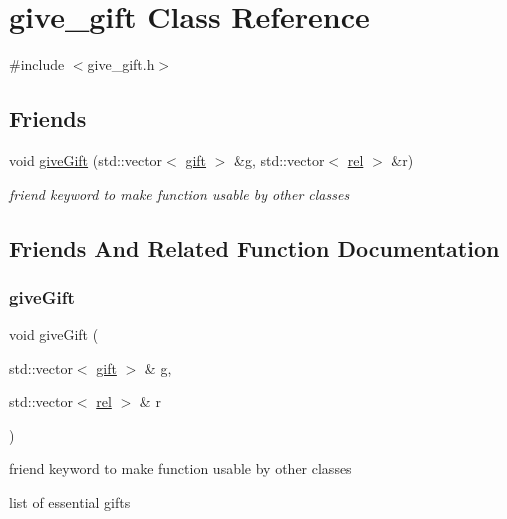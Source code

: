 \hypertarget{classgive__gift}{}\section{give\+\_\+gift Class Reference}
\label{classgive__gift}


{\ttfamily \#include $<$give\+\_\+gift.\+h$>$}

\subsection*{Friends}
\begin{DoxyCompactItemize}
\item 
void \hyperlink{classgive__gift_a4d58aac625b116fce2965ee8ed463409}{give\+Gift} (std\+::vector$<$ \hyperlink{classgift}{gift} $>$ \&g, std\+::vector$<$ \hyperlink{classrel}{rel} $>$ \&r)
\begin{DoxyCompactList}\small\item\em friend keyword to make function usable by other classes \end{DoxyCompactList}\end{DoxyCompactItemize}


\subsection{Friends And Related Function Documentation}
\mbox{\label{classgive__gift_a4d58aac625b116fce2965ee8ed463409}} 
\subsubsection{\texorpdfstring{give\+Gift}{giveGift}}
{\footnotesize\ttfamily void give\+Gift (\begin{DoxyParamCaption}\item[{std\+::vector$<$ \hyperlink{classgift}{gift} $>$ \&}]{g,  }\item[{std\+::vector$<$ \hyperlink{classrel}{rel} $>$ \&}]{r }\end{DoxyParamCaption})\hspace{0.3cm}{\ttfamily [friend]}}



friend keyword to make function usable by other classes 

list of essential gifts

